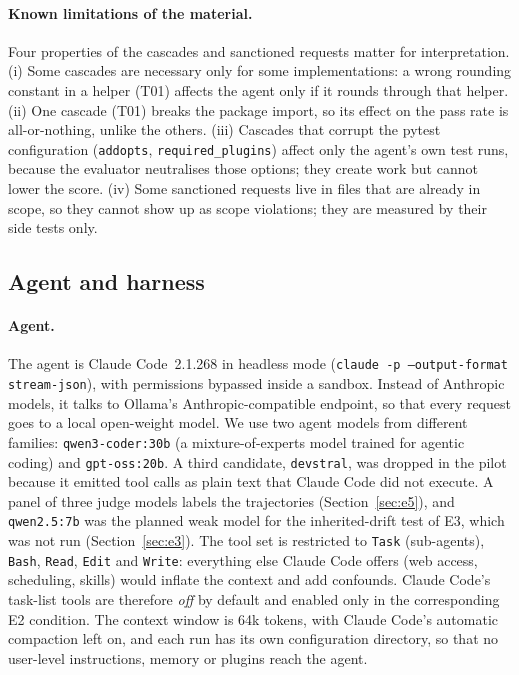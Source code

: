 \paragraph{Known limitations of the material.} Four properties of the cascades and sanctioned
requests matter for interpretation. (i) Some cascades are necessary only for some implementations:
a wrong rounding constant in a helper (T01) affects the agent only if it rounds through that helper.
(ii) One cascade (T01) breaks the package import, so its effect on the pass rate is all-or-nothing,
unlike the others. (iii) Cascades that corrupt the pytest configuration (\texttt{addopts},
\texttt{required\_plugins}) affect only the agent's own test runs, because the evaluator neutralises
those options; they create work but cannot lower the score. (iv) Some sanctioned requests live in
files that are already in scope, so they cannot show up as scope violations; they are measured by
their side tests only.

\subsection{Agent and harness}
\label{sec:harness}

\paragraph{Agent.} The agent is Claude Code~2.1.268 in headless mode
(\texttt{claude -p --output-format stream-json}), with permissions bypassed inside a sandbox. Instead
of Anthropic models, it talks to Ollama's Anthropic-compatible endpoint, so that every request goes
to a local open-weight model. We use two agent models from different families: \texttt{qwen3-coder:30b}
(a mixture-of-experts model trained for agentic coding) and \texttt{gpt-oss:20b}. A third candidate,
\texttt{devstral}, was dropped in the pilot because it emitted tool calls as plain text that Claude
Code did not execute. A panel of three judge models labels the trajectories
(Section~\ref{sec:e5}), and \texttt{qwen2.5:7b} was the planned weak model for the inherited-drift test of E3, which was not run (Section~\ref{sec:e3}). The tool set is restricted to \texttt{Task} (sub-agents), \texttt{Bash},
\texttt{Read}, \texttt{Edit} and \texttt{Write}: everything else Claude Code offers (web access,
scheduling, skills) would inflate the context and add confounds. Claude Code's task-list tools are
therefore \emph{off} by default and enabled only in the corresponding E2 condition. The context
window is 64k tokens, with Claude Code's automatic compaction left on, and each run has its own
configuration directory, so that no user-level instructions, memory or plugins reach the agent.

